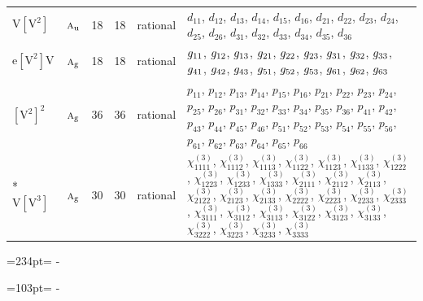 \documentclass[10pt,a4paper]{article}
\newcommand{\needspace}[1]{\par\penalty-100\begingroup\dimen0=#1\relax\dimen2=\pagegoal
  \advance\dimen2-\pagetotal\ifdim\dimen0>\dimen2\relax\ifdim\dimen2>0pt\vfil\break\fi\fi
  \endgroup}
\numberwithin{equation}{section}
\newcommand{\irr}[1]{\text{\normalfont\scshape #1}}
\newcommand{\ptag}[1]{\mathrm{#1}}
\newcommand{\jahn}[1]{\mathrm{#1}}
\newlength{\fillwidth}\newlength{\cellwidth}\newlength{\colwidth}
\begin{document}
{\begin{longtable}{@{}llrrl>{\RaggedRight\arraybackslash}p{\fillwidth}@{}}
$\jahn{V[V^{2}]}$ & $\irr{a}_{\ptag{u}}$ & 18 & 18 & rational & $d_{11}$, $d_{12}$, $d_{13}$, $d_{14}$, $d_{15}$, $d_{16}$, $d_{21}$, $d_{22}$, $d_{23}$, $d_{24}$, $d_{25}$, $d_{26}$, $d_{31}$, $d_{32}$, $d_{33}$, $d_{34}$, $d_{35}$, $d_{36}$\\
$\jahn{e[V^{2}]V}$ & $\irr{a}_{\ptag{g}}$ & 18 & 18 & rational & $\mathnormal{g}_{11}$, $\mathnormal{g}_{12}$, $\mathnormal{g}_{13}$, $\mathnormal{g}_{21}$, $\mathnormal{g}_{22}$, $\mathnormal{g}_{23}$, $\mathnormal{g}_{31}$, $\mathnormal{g}_{32}$, $\mathnormal{g}_{33}$, $\mathnormal{g}_{41}$, $\mathnormal{g}_{42}$, $\mathnormal{g}_{43}$, $\mathnormal{g}_{51}$, $\mathnormal{g}_{52}$, $\mathnormal{g}_{53}$, $\mathnormal{g}_{61}$, $\mathnormal{g}_{62}$, $\mathnormal{g}_{63}$\\
$\jahn{[V^{2}]^{2}}$ & $\irr{a}_{\ptag{g}}$ & 36 & 36 & rational & $p_{11}$, $p_{12}$, $p_{13}$, $p_{14}$, $p_{15}$, $p_{16}$, $p_{21}$, $p_{22}$, $p_{23}$, $p_{24}$, $p_{25}$, $p_{26}$, $p_{31}$, $p_{32}$, $p_{33}$, $p_{34}$, $p_{35}$, $p_{36}$, $p_{41}$, $p_{42}$, $p_{43}$, $p_{44}$, $p_{45}$, $p_{46}$, $p_{51}$, $p_{52}$, $p_{53}$, $p_{54}$, $p_{55}$, $p_{56}$, $p_{61}$, $p_{62}$, $p_{63}$, $p_{64}$, $p_{65}$, $p_{66}$\\*
$\jahn{V[V^{3}]}$ & $\irr{a}_{\ptag{g}}$ & 30 & 30 & rational & $\chi^{(3)}_{1111}$, $\chi^{(3)}_{1112}$, $\chi^{(3)}_{1113}$, $\chi^{(3)}_{1122}$, $\chi^{(3)}_{1123}$, $\chi^{(3)}_{1133}$, $\chi^{(3)}_{1222}$, $\chi^{(3)}_{1223}$, $\chi^{(3)}_{1233}$, $\chi^{(3)}_{1333}$, $\chi^{(3)}_{2111}$, $\chi^{(3)}_{2112}$, $\chi^{(3)}_{2113}$, $\chi^{(3)}_{2122}$, $\chi^{(3)}_{2123}$, $\chi^{(3)}_{2133}$, $\chi^{(3)}_{2222}$, $\chi^{(3)}_{2223}$, $\chi^{(3)}_{2233}$, $\chi^{(3)}_{2333}$, $\chi^{(3)}_{3111}$, $\chi^{(3)}_{3112}$, $\chi^{(3)}_{3113}$, $\chi^{(3)}_{3122}$, $\chi^{(3)}_{3123}$, $\chi^{(3)}_{3133}$, $\chi^{(3)}_{3222}$, $\chi^{(3)}_{3223}$, $\chi^{(3)}_{3233}$, $\chi^{(3)}_{3333}$\\
\bottomrule\end{longtable}}
\needspace{234pt}
\needspace{103pt}
\end{document}
